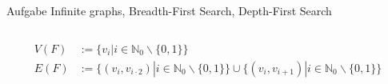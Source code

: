 \begin{frame}[allowframebreaks]{Aufgabe \thesection}{Infinite graphs, Breadth-First Search, Depth-First Search}
\begin{solution}
\begin{columns}
\begin{column}[t]{0.5\textwidth}
{\begin{minipage}{1\textwidth}
          \end{minipage}
        }
      \end{column}
    \end{columns}
  \end{solution}
  \begin{exercisenoinc}
    \begin{align*}
      V(F) &:= \{v_i | i \in \mathbb{N}_0\backslash\{0,1\}\}\\
      E(F) &:= \{(v_i,v_{i\cdot 2})| i\in \mathbb{N}_0\backslash\{0,1\}\} \cup \{(v_i,v_{i+1})|i \in \mathbb{N}_0\backslash\{0,1\}\}
    \end{align*} 
  \end{exercisenoinc}
  \begin{solutionnoinc}
    \begin{columns}
      \begin{column}[t]{0.45\textwidth}
      \end{column}
      \begin{column}[t]{0.5\textwidth}
        \resizebox{\textwidth}{!}{
          \begin{minipage}{\textwidth}


\end{minipage}}
\end{column}
\end{columns}
\end{solutionnoinc}
\end{frame}

